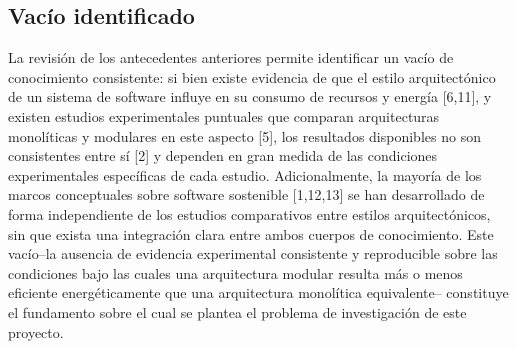 \subsection{Vacío identificado}
La revisión de los antecedentes anteriores permite identificar un vacío de conocimiento consistente: si bien existe evidencia de que el estilo arquitectónico de un sistema de software influye en su consumo de recursos y energía [6,11], y existen estudios experimentales puntuales que comparan arquitecturas monolíticas y modulares en este aspecto [5], los resultados disponibles no son consistentes entre sí [2] y dependen en gran medida de las condiciones experimentales específicas de cada estudio. Adicionalmente, la mayoría de los marcos conceptuales sobre software sostenible [1,12,13] se han desarrollado de forma independiente de los estudios comparativos entre estilos arquitectónicos, sin que exista una integración clara entre ambos cuerpos de conocimiento. Este vacío–la ausencia de evidencia experimental consistente y reproducible sobre las condiciones bajo las cuales una arquitectura modular resulta más o menos eficiente energéticamente que una arquitectura monolítica equivalente– constituye el fundamento sobre el cual se plantea el problema de investigación de este proyecto. 

